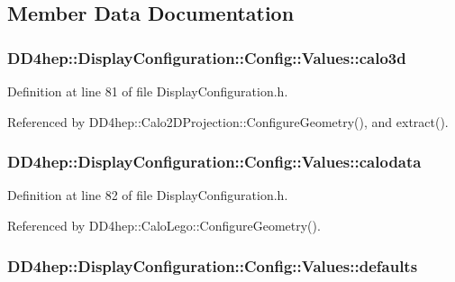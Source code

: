 \subsection{Member Data Documentation}
\hypertarget{union_d_d4hep_1_1_display_configuration_1_1_config_1_1_values_adbed006d75dc86cab0e4774c82e4be48}{
\subsubsection[{calo3d}]{ {\bf DD4hep::DisplayConfiguration::Config::Values::calo3d}}}
\label{union_d_d4hep_1_1_display_configuration_1_1_config_1_1_values_adbed006d75dc86cab0e4774c82e4be48}


Definition at line 81 of file DisplayConfiguration.h.

Referenced by DD4hep::Calo2DProjection::ConfigureGeometry(), and extract().\hypertarget{union_d_d4hep_1_1_display_configuration_1_1_config_1_1_values_ad20f453699ee7904ed8b510fa714b184}{
\subsubsection[{calodata}]{ {\bf DD4hep::DisplayConfiguration::Config::Values::calodata}}}
\label{union_d_d4hep_1_1_display_configuration_1_1_config_1_1_values_ad20f453699ee7904ed8b510fa714b184}


Definition at line 82 of file DisplayConfiguration.h.

Referenced by DD4hep::CaloLego::ConfigureGeometry().\hypertarget{union_d_d4hep_1_1_display_configuration_1_1_config_1_1_values_af0a8cde0c8737c87ee05d38de1f93505}{
\subsubsection[{defaults}]{ {\bf DD4hep::DisplayConfiguration::Config::Values::defaults}}}
\label{union_d_d4hep_1_1_display_configuration_1_1_config_1_1_values_af0a8cde0c8737c87ee05d38de1f93505}


